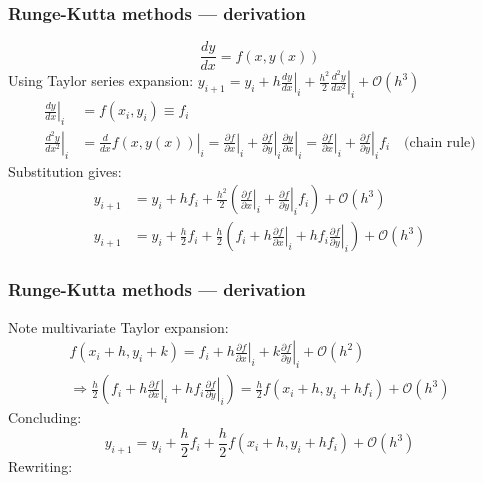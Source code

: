 \documentclass[11pt,table,final,fleqn,xcolor={usenames,dvipsnames,table}]{beamer}
\begin{document}
\begin{frame}
  \frametitle{Runge-Kutta methods --- derivation}
  \footnotesize\selectfont
  \[ \frac{dy}{dx} = f(x,y(x)) \]
  \pause Using Taylor series expansion: $\displaystyle     y_{i+1} = y_i + h \left.\frac{dy}{dx}\right|_i + \left.\frac{h^2}{2}\frac{d^2y}{dx^2}\right|_i + \mathcal{O}{(h^3)} $
  \begin{align*}
    \left.\frac{dy}{dx}\right|_i &= f(x_i,y_i) \equiv f_i \\
    \left.\frac{d^2y}{dx^2}\right|_i &= \left.\frac{d}{dx}f(x,y(x))\right|_i = \left.\frac{\partial f}{\partial x}\right|_i + \left.\frac{\partial f}{\partial y}\right|_i \left.\frac{\partial y}{\partial x}\right|_i = \left.\frac{\partial f}{\partial x}\right|_i + \left.\frac{\partial f}{\partial y}\right|_i f_i \quad \text{(chain rule)}
  \end{align*}
  \pause Substitution gives:
   \begin{align*}
    y_{i+1} &= y_i + h f_i + \frac{h^2}{2} \left( \left.\frac{\partial f}{\partial x}\right|_i +  \left.\frac{\partial f}{\partial y}\right|_i f_i \right) + \mathcal{O}{(h^3)} \\
    y_{i+1} &= y_i + \frac{h}{2} f_i + \frac{h}{2} \left( f_i + h\left.\frac{\partial f}{\partial x}\right|_i + h f_i \left.\frac{\partial f}{\partial y}\right|_i \right) + \mathcal{O}{(h^3)}
  \end{align*}
\end{frame}

\begin{frame}
  \frametitle{Runge-Kutta methods --- derivation}
  Note multivariate Taylor expansion:
  \begin{multline*}
    f(x_i+h,y_i+k) = f_i + h \left. \frac{\partial f}{\partial x}\right|_i + k\left. \frac{\partial f}{\partial y}\right|_i + \mathcal{O}{(h^2)} \\
    \Rightarrow \frac{h}{2}\left(f_i + h\left.\frac{\partial f}{\partial x}\right|_i + h f_i \left. \frac{\partial f}{\partial y} \right|_i \right) = \frac{h}{2} f\left(x_i+h,y_i+hf_i\right) + \mathcal{O}{(h^3)}
  \end{multline*}
  Concluding:
  \[
    y_{i+1} = y_i + \frac{h}{2} f_i + \frac{h}{2} f\left(x_i+h,y_i+hf_i\right) + \mathcal{O}{(h^3)}
  \]
  Rewriting:\\
\end{frame}
\end{document}
